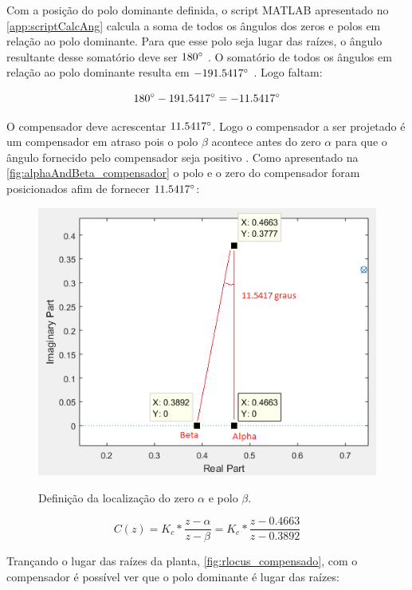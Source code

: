 \documentclass[
	article,			%
	11pt,				%
	oneside,			%
	a4paper,			%
	english,			%
	brazil,				%
	sumario=tradicional
	]{abntex2}
\begin{document}
\pagebreak

Com a posição do polo dominante definida, o script MATLAB apresentado no \autoref{app:scriptCalcAng} calcula a soma de todos os ângulos dos zeros e polos em relação ao polo dominante.
Para que esse polo seja lugar das raízes, o ângulo resultante desse somatório deve ser $180\degree$ \cite{Ogata_DTC_1995}.
O somatório de todos os ângulos em relação ao polo dominante resulta em $-191.5417\degree$ .
Logo faltam: 

$$180\degree  - 191.5417\degree  = - 11.5417\degree $$

O compensador deve acrescentar $11.5417\degree$.
Logo o compensador a ser projetado é um compensador em atraso pois o polo $\beta$ acontece antes do zero $\alpha$ para que o ângulo fornecido pelo compensador seja positivo \cite{villaca2014}. Como apresentado na \autoref{fig:alphaAndBeta_compensador} o polo e o zero do compensador foram posicionados afim de fornecer $11.5417\degree$:

\begin{figure}[htb!]
	\centering
	\caption{Definição da localização do zero $\alpha$ e polo $\beta$.}
	\includegraphics[scale=0.9]{./img/alphaAndBeta_compensador.png}
	\label{fig:alphaAndBeta_compensador}
\end{figure}

$$
	C(z) = K_c * \frac{z - \alpha}{z - \beta} = K_c * \frac{z - 0.4663}{z - 0.3892} 
$$

\pagebreak

Trançando o lugar das raízes da planta, \autoref{fig:rlocus_compensado}, com o compensador é possível ver que o polo dominante é lugar das raízes:
\end{document}
